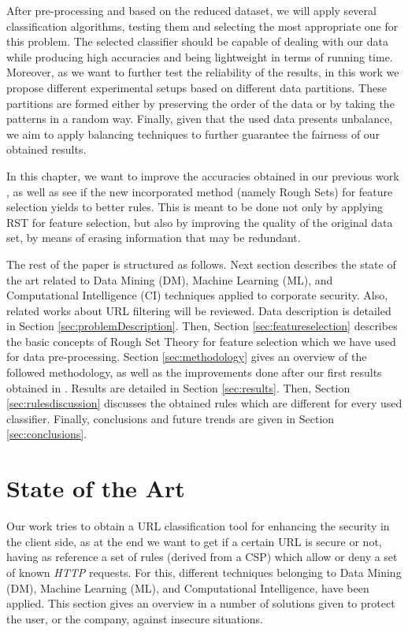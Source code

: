 \documentclass{llncs}
\begin{document}
After pre-processing and based on the reduced dataset, we will apply several classification algorithms, 
testing them and selecting the most appropriate one for this problem. The selected classifier should be capable 
of dealing with our data while producing high accuracies and
being lightweight in terms of running time. Moreover, as we want to further test the reliability of the results, 
in this work we propose different experimental setups based on different data
partitions. These partitions are formed either by preserving the order of the data or by taking the patterns in 
a random way. Finally, given that the used data presents unbalance, we aim to apply balancing 
techniques \cite{imbalance_techniques_02} to further guarantee the fairness of our obtained results.

In this chapter, we want to improve the accuracies obtained in our previous work \cite{ECTA}, 
as well as see if the new incorporated method (namely Rough Sets) for feature selection yields to better rules. 
This is meant to be done not only by applying RST for feature selection, but also by improving the quality of the 
original data set, by means of erasing information that may be redundant.

The rest of the paper is structured as follows. Next section describes the state of the art related 
to Data Mining (DM), Machine Learning (ML), and Computational Intelligence (CI) techniques applied 
to corporate security. Also, related works about URL filtering will be reviewed. Data  description is 
detailed in Section \ref{sec:problemDescription}. Then, Section \ref{sec:featureselection} describes the  
basic concepts of Rough Set Theory for feature selection which we  have used for data pre-processing. 
Section \ref{sec:methodology} gives an overview of the  followed methodology, as well as the improvements 
done after our  first results obtained in \cite{ECTA}. Results are detailed in Section \ref{sec:results}. 
Then, Section \ref{sec:rulesdiscussion}   discusses the  obtained rules which are different for every used 
classifier. Finally, conclusions and future trends are given in Section \ref{sec:conclusions}.

%
\section{State of the Art}
\label{sec:stateofart}

\noindent Our work tries to obtain a URL classification tool for enhancing the security in the client side, as at the end we want to get if a certain URL is secure or not, having as reference a set of rules (derived from a CSP) which allow or deny a set of known \textit{HTTP} requests. For this, different techniques belonging to Data Mining (DM), Machine Learning (ML), and Computational Intelligence, have been applied. This section gives  an overview in a number of solutions given to protect the user, or the company, against insecure situations. 
\end{document}
